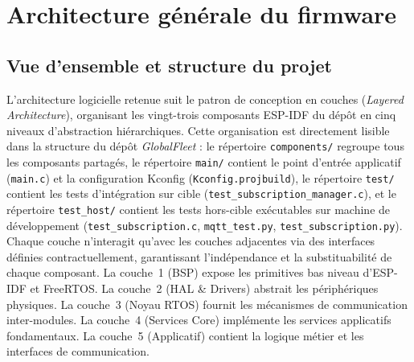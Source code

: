 \section{Architecture générale du firmware}
\label{sec:archi_gen}

\subsection{Vue d'ensemble et structure du projet}
\label{subsec:vue_ensemble}

L'architecture logicielle retenue suit le patron de conception en
couches (\textit{Layered Architecture}), organisant les vingt-trois
composants ESP-IDF du dépôt en cinq niveaux d'abstraction
hiérarchiques. Cette organisation est directement lisible dans la
structure du dépôt \textit{GlobalFleet} : le répertoire
\texttt{components/} regroupe tous les composants partagés, le
répertoire \texttt{main/} contient le point d'entrée applicatif
(\texttt{main.c}) et la configuration Kconfig (\texttt{Kconfig.projbuild}),
le répertoire \texttt{test/} contient les tests d'intégration sur
cible (\texttt{test\_subscription\_manager.c}), et le répertoire
\texttt{test\_host/} contient les tests hors-cible exécutables sur
machine de développement (\texttt{test\_subscription.c},
\texttt{mqtt\_test.py}, \texttt{test\_subscription.py}). Chaque
couche n'interagit qu'avec les couches adjacentes via des interfaces
définies contractuellement, garantissant l'indépendance et la
substituabilité de chaque composant. La couche~1 (BSP) expose les
primitives bas niveau d'ESP-IDF et FreeRTOS. La couche~2 (HAL \&
Drivers) abstrait les périphériques physiques. La couche~3 (Noyau
RTOS) fournit les mécanismes de communication inter-modules. La
couche~4 (Services Core) implémente les services applicatifs
fondamentaux. La couche~5 (Applicatif) contient la logique métier
et les interfaces de communication.
